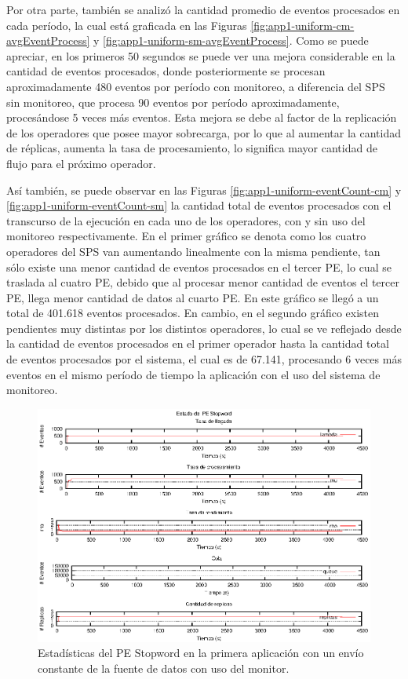 Por otra parte, también se analizó la cantidad promedio de eventos procesados en cada período, la cual está graficada en las Figuras \ref{fig:app1-uniform-cm-avgEventProcess} y \ref{fig:app1-uniform-sm-avgEventProcess}. Como se puede apreciar, en los primeros 50 segundos se puede ver una mejora considerable en la cantidad de eventos procesados, donde posteriormente se procesan aproximadamente 480 eventos por período con monitoreo, a diferencia del SPS sin monitoreo, que procesa 90 eventos por período aproximadamente, procesándose 5 veces más eventos. Esta mejora se debe al factor de la replicación de los operadores que posee mayor sobrecarga, por lo que al aumentar la cantidad de réplicas, aumenta la tasa de procesamiento, lo significa mayor cantidad de flujo para el próximo operador.

Así también, se puede observar en las Figuras \ref{fig:app1-uniform-eventCount-cm} y \ref{fig:app1-uniform-eventCount-sm} la cantidad total de eventos procesados con el transcurso de la ejecución en cada uno de los operadores, con y sin uso del monitoreo respectivamente. En el primer gráfico se denota como los cuatro operadores del SPS van aumentando linealmente con la misma pendiente, tan sólo existe una menor cantidad de eventos procesados en el tercer PE, lo cual se traslada al cuatro PE, debido que al procesar menor cantidad de eventos el tercer PE, llega menor cantidad de datos al cuarto PE. En este gráfico se llegó a un total de 401.618 eventos procesados. En cambio, en el segundo gráfico existen pendientes muy distintas por los distintos operadores, lo cual se ve reflejado desde la cantidad de eventos procesados en el primer operador hasta la cantidad total de eventos procesados por el sistema, el cual es de 67.141, procesando 6 veces más eventos en el mismo período de tiempo la aplicación con el uso del sistema de monitoreo.

\begin{figure}[p]
\centering
    \includegraphics[scale=1.1]{images/exp/app1/uniform/cm/statusStopwordPE.eps}
    \caption{Estadísticas del PE Stopword en la primera aplicación con un envío constante de la fuente de datos con uso del monitor.}
    \label{fig:app1-uniform-statusStopwordPE-cm}
\end{figure}

